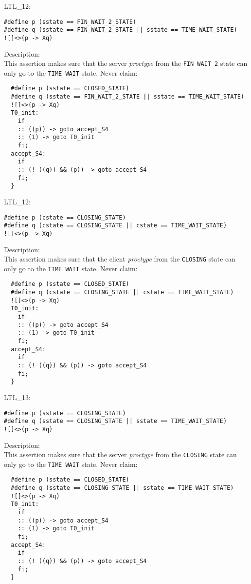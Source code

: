 \documentclass{WigReport}
\begin{document}
LTL\_12:\\
\begin{verbatim}
#define p (sstate == FIN_WAIT_2_STATE)
#define q (sstate == FIN_WAIT_2_STATE || sstate == TIME_WAIT_STATE)
![]<>(p -> Xq)
\end{verbatim}
Description:\\
This assertion makes sure that the server \textit{proctype} from the \verb|FIN WAIT 2| state can only go to the \verb|TIME WAIT| state.
Never claim:\\
\begin{verbatim}
  #define p (sstate == CLOSED_STATE)
  #define q (sstate == FIN_WAIT_2_STATE || sstate == TIME_WAIT_STATE)
  ![]<>(p -> Xq)
  T0_init:
    if
    :: ((p)) -> goto accept_S4
    :: (1) -> goto T0_init
    fi;
  accept_S4:
    if
    :: (! ((q)) && (p)) -> goto accept_S4
    fi;
  }
\end{verbatim}


LTL\_12:\\
\begin{verbatim}
#define p (cstate == CLOSING_STATE)
#define q (cstate == CLOSING_STATE || cstate == TIME_WAIT_STATE)
![]<>(p -> Xq)
\end{verbatim}
Description:\\
This assertion makes sure that the client \textit{proctype} from the \verb|CLOSING| state can only go to the \verb|TIME WAIT| state.
Never claim:\\
\begin{verbatim}
  #define p (sstate == CLOSED_STATE)
  #define q (cstate == CLOSING_STATE || cstate == TIME_WAIT_STATE)
  ![]<>(p -> Xq)
  T0_init:
    if
    :: ((p)) -> goto accept_S4
    :: (1) -> goto T0_init
    fi;
  accept_S4:
    if
    :: (! ((q)) && (p)) -> goto accept_S4
    fi;
  }
\end{verbatim}


LTL\_13:\\
\begin{verbatim}
#define p (sstate == CLOSING_STATE)
#define q (sstate == CLOSING_STATE || sstate == TIME_WAIT_STATE)
![]<>(p -> Xq)
\end{verbatim}
Description:\\
This assertion makes sure that the server \textit{proctype} from the \verb|CLOSING| state can only go to the \verb|TIME WAIT| state.
Never claim:\\
\begin{verbatim}
  #define p (sstate == CLOSED_STATE)
  #define q (sstate == CLOSING_STATE || sstate == TIME_WAIT_STATE)
  ![]<>(p -> Xq)
  T0_init:
    if
    :: ((p)) -> goto accept_S4
    :: (1) -> goto T0_init
    fi;
  accept_S4:
    if
    :: (! ((q)) && (p)) -> goto accept_S4
    fi;
  }
\end{verbatim}
\end{document}
